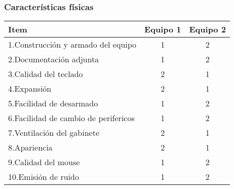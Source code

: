\subsubsection{Características físicas}
\begin{center}
\begin{tabular}{|lcc|} \hline
\footnotesize\textbf{Item} & \footnotesize\textbf{Equipo 1} & \footnotesize\textbf{Equipo 2} \\\hline
1.Construcción y armado del equipo & 1 & 2 \\\hline
2.Documentación adjunta & 1 & 2 \\\hline
3.Calidad del teclado & 2 & 1 \\\hline
4.Expansión & 2 & 1 \\\hline
5.Facilidad de desarmado & 1 & 2 \\\hline
6.Facilidad de cambio de perifericos & 1 & 2 \\\hline
7.Ventilación del gabinete & 2 & 1 \\\hline
8.Apariencia & 2 & 1 \\\hline
9.Calidad del mouse & 1 & 2 \\\hline
10.Emisión de ruido & 1 & 2 \\\hline
\end{tabular}
\end{center}

